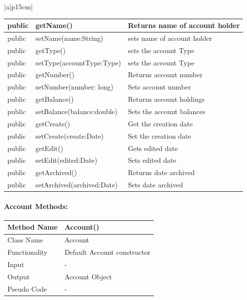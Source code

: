 \documentclass[12pt]{article}
\begin{document}
\begin{table}[H]
\begin{tabular}{|a|p{15cm}|}
\begin{tabular}{| p{2cm} | p{5cm} | p{6.9cm} |}
			\hline
			public &  getName() & Returns name of account holder\\
			\hline
			public &  setName(name:String) & sets name of account holder\\
			\hline
			public &  getType() & sets the account Type\\
			\hline
			public &  setType(accountType:Type) & sets the account Type\\
			\hline
			public &  getNumber() & Returns account number\\
			\hline
			public &  setNumber(number: long) & Sets account number\\
			\hline
			public &  getBalance() & Returns account holdings\\
			\hline
			public &  setBalance(balance:double) & Sets the account balances\\
			\hline
			public &  getCreate() & Get the creation date\\
			\hline
			public &  setCreate(create:Date) & Set the creation date\\
			\hline
			public &  getEdit() & Gets edited date\\
			\hline
			public &  setEdit(edited:Date) & Sets edited date\\
			\hline
			public &  getArchived() & Returns date archived\\
			\hline
			public &  setArchived(archived:Date) & Sets date archived\\
			\hline
			
		\end{tabular}								 
	\end{tabular}
\end{table}
\paragraph{Account Methods:}

\begin{tabular}{ |p{3cm}||p{\colWidth}|  }
	\hline
	Method Name &  Account()\\
	\hline
	Class Name & Account\\
	\hline
	Functionality & Default Account constructor\\
	\hline
	Input & -\\
	\hline
	Output & Account Object\\
	\hline
	Pseudo Code & -\\
	\hline
\end{tabular}  
\end{document}
